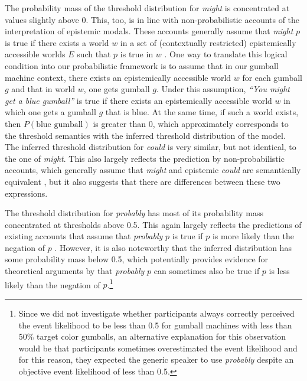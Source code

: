 \documentclass[man, floatsintext]{apa6}
\begin{document}
The probability mass of the threshold distribution for \textit{might} is  concentrated at values slightly above 0. This, too, 
is in line with non-probabilistic accounts of the interpretation of epistemic modals. These accounts generally assume that \textit{might} $p$ is true 
if there exists a world $w$ in a set of (contextually restricted) epistemically accessible worlds $E$ such that $p$ is true in $w$ 
\parencite[e.g.,][]{Kratzer1991,Swanson2008,Hacquard2011}. One way to translate this logical condition into our probabilistic framework is to assume that 
in our gumball machine context, there exists an epistemically accessible world $w$ for each gumball $g$ and that in world $w$, one gets gumball $g$. 
Under this assumption, \textit{``You might get a blue gumball''} is true if there exists an epistemically accessible world $w$  in which one gets a
gumball $g$ that is blue. At the same time, if such a world exists, then $P(\mbox{blue gumball})$ is greater than 0, which approximately corresponds
to the threshold semantics with the inferred threshold distribution of the model. The inferred threshold distribution for \textit{could} is very similar, 
but not identical, to the one of \textit{might}. This also largely reflects the prediction by non-probabilistic accounts, which generally assume that \textit{might} and epistemic 
\textit{could} are semantically equivalent \parencite{Kratzer1991,Hacquard2011}, but it also suggests that there are differences between these two expressions. 

The threshold distribution for \textit{probably} has most of its probability mass concentrated at thresholds above 0.5. This again largely reflects the predictions of 
existing accounts that assume that \textit{probably} $p$ is true if $p$ is more likely than the negation of $p$ \parencite[e.g.,][]{Kratzer1991}. However, it is also noteworthy that the inferred
distribution has some probability mass below 0.5, which potentially provides evidence for theoretical arguments by \textcite{Yalcin2010} that \textit{probably} $p$ can
sometimes also be true if $p$ is less likely than the negation of $p$.\footnote{Since we did not investigate whether participants always 
correctly perceived the event likelihood to be less than 0.5 for gumball machines with less than 50\% target color gumballs, an alternative explanation for this observation would be that participants sometimes overestimated the event likelihood and for this reason, they expected the generic speaker to use \textit{probably} despite an objective event likelihood of less than 0.5.}
\end{document}

